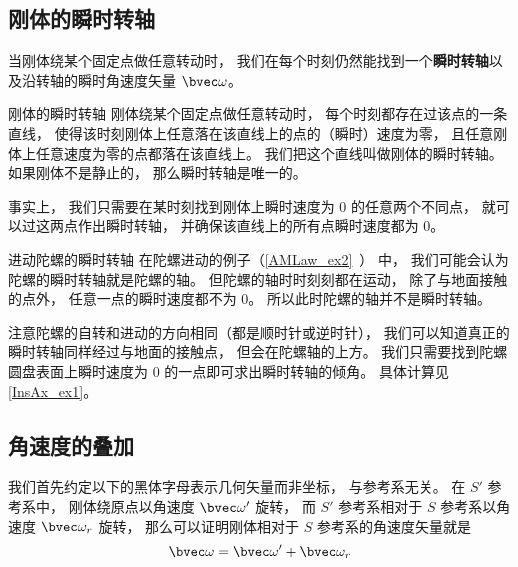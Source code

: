 


\subsection{刚体的瞬时转轴}
当刚体绕某个固定点做任意转动时， 我们在每个时刻仍然能找到一个\textbf{瞬时转轴}以及沿转轴的瞬时角速度矢量 $\bvec \omega$。

\begin{theorem}{刚体的瞬时转轴}
刚体绕某个固定点做任意转动时， 每个时刻都存在过该点的一条直线， 使得该时刻刚体上任意落在该直线上的点的（瞬时）速度为零， 且任意刚体上任意速度为零的点都落在该直线上。 我们把这个直线叫做刚体的瞬时转轴。 如果刚体不是静止的， 那么瞬时转轴是唯一的。
\end{theorem}
事实上， 我们只需要在某时刻找到刚体上瞬时速度为 0 的任意两个不同点， 就可以过这两点作出瞬时转轴， 并确保该直线上的所有点瞬时速度都为 0。

\begin{example}{进动陀螺的瞬时转轴}\label{InsAx_ex2}
在陀螺进动的例子（\autoref{AMLaw_ex2}~） 中， 我们可能会认为陀螺的瞬时转轴就是陀螺的轴。 但陀螺的轴时时刻刻都在运动， 除了与地面接触的点外， 任意一点的瞬时速度都不为 0。 所以此时陀螺的轴并不是瞬时转轴。

注意陀螺的自转和进动的方向相同（都是顺时针或逆时针）， 我们可以知道真正的瞬时转轴同样经过与地面的接触点， 但会在陀螺轴的上方。 我们只需要找到陀螺圆盘表面上瞬时速度为 0 的一点即可求出瞬时转轴的倾角。 具体计算见\autoref{InsAx_ex1}。
\end{example}

\subsection{角速度的叠加}

我们首先约定以下的黑体字母表示几何矢量而非坐标， 与参考系无关。 在 $S'$ 参考系中， 刚体绕原点以角速度 $\bvec \omega'$ 旋转， 而 $S'$ 参考系相对于 $S$ 参考系以角速度 $\bvec \omega_r$ 旋转， 那么可以证明刚体相对于 $S$ 参考系的角速度矢量就是
\begin{equation}\label{InsAx_eq1}
\bvec \omega = \bvec \omega' + \bvec \omega_r
\end{equation}

